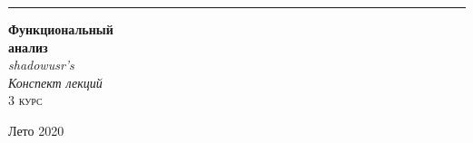 % 
%
%
%
%
\begin{titlepage} %
	
	\raggedleft %
	
	\rule{1pt}{\textheight} %
	\hspace{0.05\textwidth} %
	\parbox[b]{0.75\textwidth}{ %
		
		{\Huge\bfseries Функциональный \\[0.5\baselineskip] анализ}\\[2\baselineskip] %
		{\normalsize\textit{shadowusr's}}\\
		{\large\textit{Конспект лекций}}\\[4\baselineskip] %
		{\Large\textsc{3 курс}} %
		
		\vspace{0.5\textheight} %
		
		{\noindent Лето 2020}\\[\baselineskip] %
	}
	
\end{titlepage}